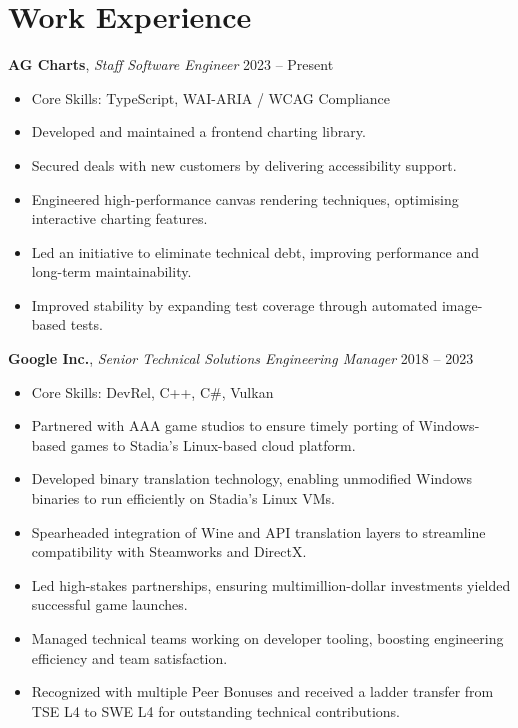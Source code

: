 \documentclass[a4paper,10pt]{article}
\newcommand{\coreskills}[1]{\item Core Skills: #1}
\begin{document}
{\begin{minipage}[t]{0.72\textwidth}
    \section*{\color{navy} Work Experience}

    \textbf{AG Charts}, \textit{Staff Software Engineer} \hfill 2023 -- Present
    \begin{itemize}[leftmargin=1.5em, nosep]
        \coreskills{TypeScript, WAI-ARIA / WCAG Compliance}
        \item Developed and maintained a frontend charting library.
        \item Secured deals with new customers by delivering accessibility support.
        \item Engineered high-performance canvas rendering techniques, optimising interactive charting features.
        \item Led an initiative to eliminate technical debt, improving performance and long-term maintainability.
        \item Improved stability by expanding test coverage through automated image-based tests.
    \end{itemize}
    \vspace{0.5em}

    \textbf{Google Inc.}, \textit{Senior Technical Solutions Engineering Manager} \hfill 2018 -- 2023
    \begin{itemize}[leftmargin=1.5em, nosep]
        \coreskills{DevRel, C++, C\#, Vulkan}
        \item Partnered with AAA game studios to ensure timely porting of Windows-based games to Stadia's Linux-based cloud platform.
        \item Developed binary translation technology, enabling unmodified Windows binaries to run efficiently on Stadia's Linux VMs.
        \item Spearheaded integration of Wine and API translation layers to streamline compatibility with Steamworks and DirectX.
        \item Led high-stakes partnerships, ensuring multimillion-dollar investments yielded successful game launches.
        \item Managed technical teams working on developer tooling, boosting engineering efficiency and team satisfaction.
        \item Recognized with multiple Peer Bonuses and received a ladder transfer from TSE L4 to SWE L4 for outstanding technical contributions.
    \end{itemize}
    \vspace{0.5em}


\end{minipage}}
\end{document}
